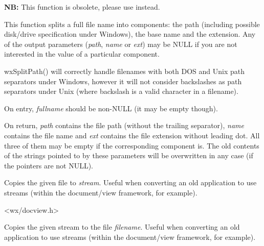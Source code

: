 \label{wxsplitfunction}


{\bf NB:} This function is obsolete, please use
 instead.

This function splits a full file name into components: the path (including possible disk/drive
specification under Windows), the base name and the extension. Any of the output parameters
({\it path}, {\it name} or {\it ext}) may be NULL if you are not interested in the value of
a particular component.

wxSplitPath() will correctly handle filenames with both DOS and Unix path separators under
Windows, however it will not consider backslashes as path separators under Unix (where backslash
is a valid character in a filename).

On entry, {\it fullname} should be non-NULL (it may be empty though).

On return, {\it path} contains the file path (without the trailing separator), {\it name}
contains the file name and {\it ext} contains the file extension without leading dot. All
three of them may be empty if the corresponding component is. The old contents of the
strings pointed to by these parameters will be overwritten in any case (if the pointers
are not NULL).


\label{wxtransferfiletostream}


Copies the given file to {\it stream}. Useful when converting an old application to
use streams (within the document/view framework, for example).


<wx/docview.h>


\label{wxtransferstreamtofile}


Copies the given stream to the file {\it filename}. Useful when converting an old application to
use streams (within the document/view framework, for example).


